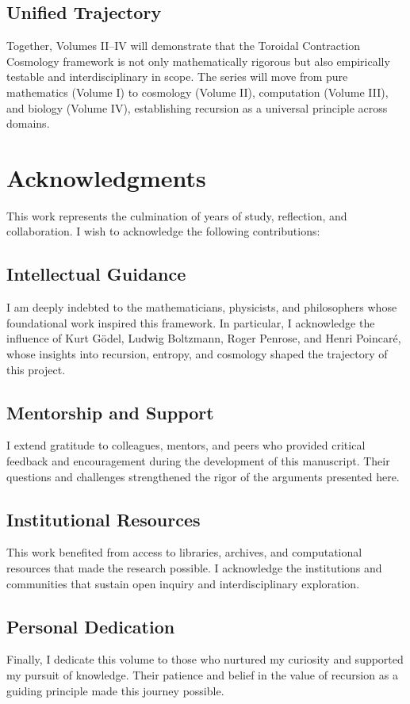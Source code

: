 \documentclass[12pt,openany]{book}
\theoremstyle{plain}
\theoremstyle{definition}
\theoremstyle{remark}
\begin{document}
\section{Unified Trajectory}
Together, Volumes II–IV will demonstrate that the Toroidal Contraction Cosmology 
framework is not only mathematically rigorous but also empirically testable and 
interdisciplinary in scope. The series will move from pure mathematics (Volume I) 
to cosmology (Volume II), computation (Volume III), and biology (Volume IV), 
establishing recursion as a universal principle across domains.

\chapter{Acknowledgments}

This work represents the culmination of years of study, reflection, and collaboration. 
I wish to acknowledge the following contributions:

\section{Intellectual Guidance}
I am deeply indebted to the mathematicians, physicists, and philosophers whose 
foundational work inspired this framework. In particular, I acknowledge the 
influence of Kurt Gödel, Ludwig Boltzmann, Roger Penrose, and Henri Poincaré, 
whose insights into recursion, entropy, and cosmology shaped the trajectory of 
this project.

\section{Mentorship and Support}
I extend gratitude to colleagues, mentors, and peers who provided critical 
feedback and encouragement during the development of this manuscript. Their 
questions and challenges strengthened the rigor of the arguments presented here.

\section{Institutional Resources}
This work benefited from access to libraries, archives, and computational 
resources that made the research possible. I acknowledge the institutions 
and communities that sustain open inquiry and interdisciplinary exploration.

\section{Personal Dedication}
Finally, I dedicate this volume to those who nurtured my curiosity and supported 
my pursuit of knowledge. Their patience and belief in the value of recursion 
as a guiding principle made this journey possible.
\end{document}

